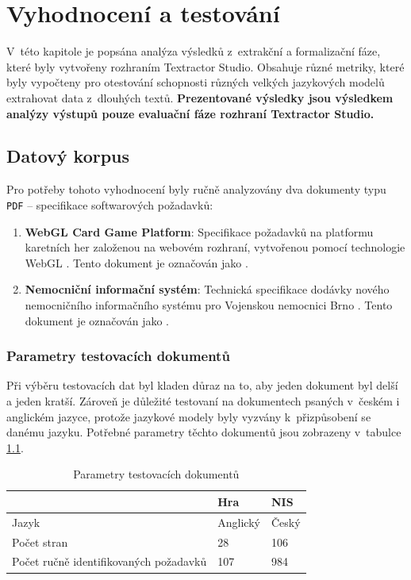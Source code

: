 \documentclass[czech, bc, kiv, he, iso690numb, pdf]{fasthesis}
\begin{document}
\chapter{Vyhodnocení a testování}\label{sec:vyhodnoceni}
V~této kapitole je popsána analýza výsledků z~extrakční a formalizační fáze, které byly vytvořeny rozhraním Textractor Studio. Obsahuje různé metriky, které byly vypočteny pro otestování schopnosti různých velkých jazykových modelů extrahovat data z~dlouhých textů. \textbf{Prezentované výsledky jsou výsledkem analýzy výstupů pouze evaluační fáze rozhraní Textractor Studio.}

\section{Datový korpus}\label{sec:korpus}
Pro potřeby tohoto vyhodnocení byly ručně analyzovány dva dokumenty typu \verb"PDF" -- specifikace softwarových požadavků:
\begin{enumerate}
    \item \textbf{WebGL Card Game Platform}: Specifikace požadavků na platformu karetních her založenou na webovém rozhraní, vytvořenou pomocí technologie WebGL \cite{doc-hra}. Tento dokument je označován jako .
    \item \textbf{Nemocniční informační systém}: Technická specifikace dodávky nového nemocničního informačního systému pro Vojenskou nemocnici Brno \cite{doc-nis}. Tento dokument je označován jako . 
\end{enumerate}

\subsection{Parametry testovacích dokumentů}
Při výběru testovacích dat byl kladen důraz na to, aby jeden dokument byl delší a jeden kratší. Zároveň je důležité testovaní na dokumentech psaných v~českém i anglickém jazyce, protože jazykové modely byly vyzvány k~přizpůsobení se danému jazyku. Potřebné parametry těchto dokumentů jsou zobrazeny v~tabulce \ref{tab:parametry-golden-doc}.

\begin{table}[h! ]
\centering
\caption{Parametry testovacích dokumentů}
\label{tab:parametry-golden-doc}
\begin{tabularx}{\textwidth}{lXX}
\hline\hline
 & \textbf{Hra} & \textbf{NIS} \\ \hline
Jazyk                                        & Anglický & Český \\
Počet stran                                  & 28       & 106   \\
Počet ručně identifikovaných požadavků       & 107      & 984   \\
\hline\hline
\end{tabularx}
\end{table}
\end{document}
